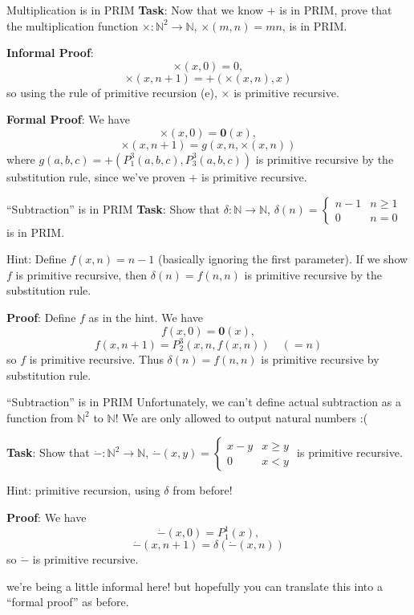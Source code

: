 \documentclass{beamer}
\newcommand{\N}{\mathbb N}
\begin{document}
\begin{frame}{Multiplication is in PRIM}
\textbf{Task}: Now that we know $+$ is in PRIM, prove that the multiplication function $\times: \N^2 \to \N$, $\times(m, n) = mn$, is in PRIM.

\pause

\textbf{Informal Proof}:
$$\times(x, 0) = 0,$$
$$\times(x, n + 1) = +(\times(x, n), x)$$
so using the rule of primitive recursion (e), $\times$ is primitive recursive.

\textbf{Formal Proof}:
We have
$$\times(x, 0) = \mathbf 0(x),$$
$$\times(x, n + 1) = g(x, n, \times(x, n))$$
where $g(a, b, c) = +(P_1^3(a, b, c), P_3^3(a, b, c))$ is primitive recursive by the substitution rule, since we've proven $+$ is primitive recursive.
\end{frame}

\begin{frame}{``Subtraction'' is in PRIM}
\textbf{Task}: Show that $\delta: \N \to \N$, $\delta(n) = \begin{cases} n - 1 & n \geq 1\\ 0 & n = 0\end{cases}$ is in PRIM. 

Hint: Define $f(x, n) = n - 1$ (basically ignoring the first parameter). If we show $f$ is primitive recursive, then $\delta(n) = f(n, n)$ is primitive recursive by the substitution rule.

\pause

\textbf{Proof}: 
Define $f$ as in the hint. We have
$$f(x, 0) = \mathbf 0(x),$$
$$f(x, n + 1) = P_2^3(x, n, f(x, n)) \quad (=n)$$
so $f$ is primitive recursive. Thus $\delta(n) = f(n, n)$ is primitive recursive by substitution rule.
\end{frame}

\begin{frame}{``Subtraction'' is in PRIM}
Unfortunately, we can't define actual subtraction as a function from $\N^2$ to $\N$! We are only allowed to output natural numbers :(

\pause

\textbf{Task}: Show that $\dot{-}: \N^2 \to \N$, $\dot{-}(x, y) = \begin{cases} x - y & x \geq y\\ 0 & x < y\end{cases}$ is primitive recursive.

Hint: primitive recursion, using $\delta$ from before!

\pause

\textbf{Proof}:
We have
$$\dot{-}(x, 0) = P_1^1(x),$$
$$\dot{-}(x, n + 1) = \delta(\dot{-}(x, n))$$
so $\dot{-}$ is primitive recursive.

\tiny{we're being a little informal here! but hopefully you can translate this into a ``formal proof'' as before.}
\end{frame}
\end{document}
